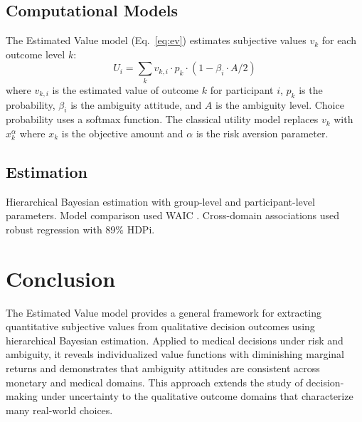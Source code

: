 \documentclass[11pt]{article}
\begin{document}
\subsection{Computational Models}
The Estimated Value model (Eq.~\ref{eq:ev}) estimates subjective values $v_k$ for each outcome level $k$:
\begin{equation}
\label{eq:ev}
U_i = \sum_k v_{k,i} \cdot p_k \cdot (1 - \beta_i \cdot A / 2)
\end{equation}
where $v_{k,i}$ is the estimated value of outcome $k$ for participant $i$, $p_k$ is the probability, $\beta_i$ is the ambiguity attitude, and $A$ is the ambiguity level. Choice probability uses a softmax function. The classical utility model replaces $v_k$ with $x_k^\alpha$ where $x_k$ is the objective amount and $\alpha$ is the risk aversion parameter.

\subsection{Estimation}
Hierarchical Bayesian estimation \citep{gelman2013bayesian, kruschke2018bayesian} with group-level and participant-level parameters. Model comparison used WAIC \citep{vehtari2017practical}. Cross-domain associations used robust regression with 89\% HDPi.

\section{Conclusion}

The Estimated Value model provides a general framework for extracting quantitative subjective values from qualitative decision outcomes using hierarchical Bayesian estimation. Applied to medical decisions under risk and ambiguity, it reveals individualized value functions with diminishing marginal returns and demonstrates that ambiguity attitudes are consistent across monetary and medical domains. This approach extends the study of decision-making under uncertainty to the qualitative outcome domains that characterize many real-world choices.



\end{document}
